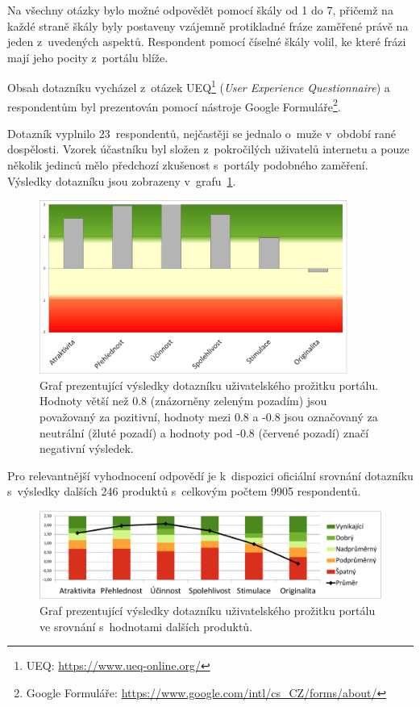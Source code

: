 Na všechny otázky bylo možné odpovědět pomocí škály od 1 do 7, přičemž na každé straně škály byly postaveny vzájemně protikladné fráze zaměřené právě na jeden z~uvedených aspektů. Respondent pomocí číselné škály volil, ke které frázi mají jeho pocity z~portálu blíže.

Obsah dotazníku vycházel z~otázek UEQ\footnote{UEQ: \url{https://www.ueq-online.org/}} (\emph{User Experience Questionnaire}) a respondentům byl prezentován pomocí nástroje Google Formuláře\footnote{Google Formuláře: \url{https://www.google.com/intl/cs_CZ/forms/about/}}.

Dotazník vyplnilo 23~respondentů, nejčastěji se jednalo o~muže v~období rané dospělosti. Vzorek účastníku byl složen z~pokročilých uživatelů internetu a pouze několik jedinců mělo předchozí zkušenost s~portály podobného zaměření. Výsledky dotazníku jsou zobrazeny v~grafu~\ref{img:ueq-result}.

\begin{figure}[H]
	\centering
	\includegraphics[width=0.9\textwidth]{obrazky-figures/ueq-result.pdf}
	\caption{Graf prezentující výsledky dotazníku uživatelského prožitku portálu. Hodnoty větší než 0.8 (znázorněny zeleným pozadím) jsou považovaný za pozitivní, hodnoty mezi 0.8 a -0.8 jsou označovaný za neutrální (žluté pozadí) a hodnoty pod -0.8 (červené pozadí) značí negativní výsledek.}
    \label{img:ueq-result}
\end{figure}

Pro relevantnější vyhodnocení odpovědí je k~dispozici oficiální srovnání dotazníku s~výsledky dalších 246 produktů s~celkovým počtem 9905 respondentů. 

\begin{figure}[H]
	\centering
	\includegraphics[width=\textwidth]{obrazky-figures/ueq-benchmark.pdf}
	\caption{Graf prezentující výsledky dotazníku uživatelského prožitku portálu ve srovnání s~hodnotami dalších produktů.}
    \label{img:ueq}
\end{figure}

